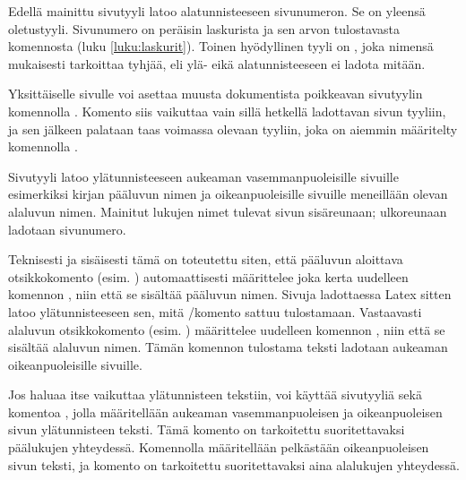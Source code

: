 Edellä mainittu sivutyyli  latoo alatunnisteeseen
sivunumeron. Se on yleensä oletustyyli.  Sivunumero
on peräisin laskurista  ja sen arvon tulostavasta komennosta
 (luku \ref{luku:laskurit}). Toinen hyödyllinen
tyyli on ,  joka nimensä mukaisesti
tarkoittaa tyhjää, eli ylä- eikä alatunnisteeseen ei ladota mitään.

Yksittäiselle sivulle voi asettaa muusta dokumentista poikkeavan
sivutyylin komennolla . Komento siis
vaikuttaa vain sillä hetkellä ladottavan sivun tyyliin, ja sen jälkeen
palataan taas voimassa olevaan tyyliin, joka on aiemmin määritelty
komennolla .

\begin{koodilohkosis}
  \thispagestyle{empty}
\end{koodilohkosis}

Sivutyyli   latoo
ylätunnisteeseen aukeaman vasemmanpuoleisille sivuille esimerkiksi
kirjan pääluvun nimen ja oikeanpuoleisille sivuille meneillään olevan
alaluvun nimen. Mainitut lukujen nimet tulevat sivun sisäreunaan;
ulkoreunaan ladotaan sivunumero.

Teknisesti ja sisäisesti tämä on toteutettu siten, että pääluvun
aloittava otsikkokomento (esim. ) automaattisesti
määrittelee joka kerta uudelleen komennon , niin
että se sisältää pääluvun nimen. Sivuja ladottaessa Latex sitten latoo
ylätunnisteeseen sen, mitä \-/komento sattuu
tulostamaan. Vastaavasti alaluvun otsikkokomento (esim. ) määrittelee uudelleen komennon ,
niin että se sisältää alaluvun nimen. Tämän komennon tulostama teksti
ladotaan aukeaman oikeanpuoleisille sivuille.

Jos haluaa itse vaikuttaa ylätunnisteen tekstiin, voi käyttää sivutyyliä
  sekä komentoa
, jolla määritellään aukeaman vasemmanpuoleisen
ja oikeanpuoleisen sivun ylätunnisteen teksti. Tämä komento on
tarkoitettu suoritettavaksi päälukujen yhteydessä. Komennolla
 määritellään pelkästään oikeanpuoleisen sivun
teksti, ja komento on tarkoitettu suoritettavaksi aina alalukujen
yhteydessä.

\begin{koodilohkosis}
\end{koodilohkosis}

